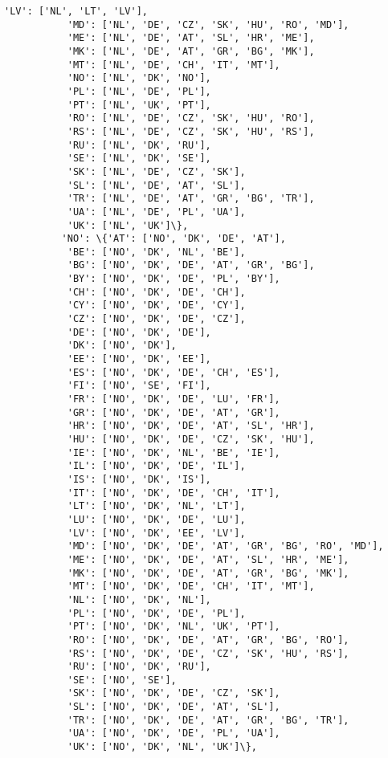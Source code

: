 \documentclass[11pt]{article}
\begin{document}
\begin{Verbatim}[commandchars=\\\{\}]
           'LV': ['NL', 'LT', 'LV'],
           'MD': ['NL', 'DE', 'CZ', 'SK', 'HU', 'RO', 'MD'],
           'ME': ['NL', 'DE', 'AT', 'SL', 'HR', 'ME'],
           'MK': ['NL', 'DE', 'AT', 'GR', 'BG', 'MK'],
           'MT': ['NL', 'DE', 'CH', 'IT', 'MT'],
           'NO': ['NL', 'DK', 'NO'],
           'PL': ['NL', 'DE', 'PL'],
           'PT': ['NL', 'UK', 'PT'],
           'RO': ['NL', 'DE', 'CZ', 'SK', 'HU', 'RO'],
           'RS': ['NL', 'DE', 'CZ', 'SK', 'HU', 'RS'],
           'RU': ['NL', 'DK', 'RU'],
           'SE': ['NL', 'DK', 'SE'],
           'SK': ['NL', 'DE', 'CZ', 'SK'],
           'SL': ['NL', 'DE', 'AT', 'SL'],
           'TR': ['NL', 'DE', 'AT', 'GR', 'BG', 'TR'],
           'UA': ['NL', 'DE', 'PL', 'UA'],
           'UK': ['NL', 'UK']\},
          'NO': \{'AT': ['NO', 'DK', 'DE', 'AT'],
           'BE': ['NO', 'DK', 'NL', 'BE'],
           'BG': ['NO', 'DK', 'DE', 'AT', 'GR', 'BG'],
           'BY': ['NO', 'DK', 'DE', 'PL', 'BY'],
           'CH': ['NO', 'DK', 'DE', 'CH'],
           'CY': ['NO', 'DK', 'DE', 'CY'],
           'CZ': ['NO', 'DK', 'DE', 'CZ'],
           'DE': ['NO', 'DK', 'DE'],
           'DK': ['NO', 'DK'],
           'EE': ['NO', 'DK', 'EE'],
           'ES': ['NO', 'DK', 'DE', 'CH', 'ES'],
           'FI': ['NO', 'SE', 'FI'],
           'FR': ['NO', 'DK', 'DE', 'LU', 'FR'],
           'GR': ['NO', 'DK', 'DE', 'AT', 'GR'],
           'HR': ['NO', 'DK', 'DE', 'AT', 'SL', 'HR'],
           'HU': ['NO', 'DK', 'DE', 'CZ', 'SK', 'HU'],
           'IE': ['NO', 'DK', 'NL', 'BE', 'IE'],
           'IL': ['NO', 'DK', 'DE', 'IL'],
           'IS': ['NO', 'DK', 'IS'],
           'IT': ['NO', 'DK', 'DE', 'CH', 'IT'],
           'LT': ['NO', 'DK', 'NL', 'LT'],
           'LU': ['NO', 'DK', 'DE', 'LU'],
           'LV': ['NO', 'DK', 'EE', 'LV'],
           'MD': ['NO', 'DK', 'DE', 'AT', 'GR', 'BG', 'RO', 'MD'],
           'ME': ['NO', 'DK', 'DE', 'AT', 'SL', 'HR', 'ME'],
           'MK': ['NO', 'DK', 'DE', 'AT', 'GR', 'BG', 'MK'],
           'MT': ['NO', 'DK', 'DE', 'CH', 'IT', 'MT'],
           'NL': ['NO', 'DK', 'NL'],
           'PL': ['NO', 'DK', 'DE', 'PL'],
           'PT': ['NO', 'DK', 'NL', 'UK', 'PT'],
           'RO': ['NO', 'DK', 'DE', 'AT', 'GR', 'BG', 'RO'],
           'RS': ['NO', 'DK', 'DE', 'CZ', 'SK', 'HU', 'RS'],
           'RU': ['NO', 'DK', 'RU'],
           'SE': ['NO', 'SE'],
           'SK': ['NO', 'DK', 'DE', 'CZ', 'SK'],
           'SL': ['NO', 'DK', 'DE', 'AT', 'SL'],
           'TR': ['NO', 'DK', 'DE', 'AT', 'GR', 'BG', 'TR'],
           'UA': ['NO', 'DK', 'DE', 'PL', 'UA'],
           'UK': ['NO', 'DK', 'NL', 'UK']\},

\end{Verbatim}
\end{document}
